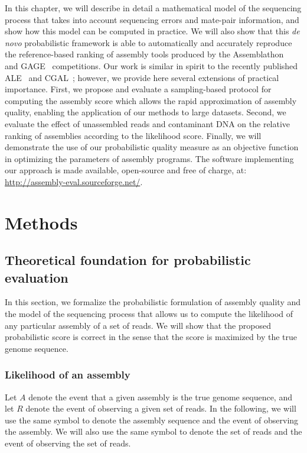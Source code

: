 \documentclass[12pt,\mydriver]{thesis}
\begin{document}
In this chapter, we will describe in detail a mathematical model of the
sequencing process that takes into account sequencing errors and
mate-pair information, and show how this model can be computed in
practice. We will also show that this \emph{de novo} probabilistic framework is able to automatically and accurately reproduce the
reference-based ranking of assembly tools produced by the
Assemblathon~\cite{earl2011assemblathon} and GAGE~\cite{salzberg2011gage}
competitions.
Our work is similar in spirit to the recently published ALE~\cite{clark2013ale} and CGAL~\cite{rahman2013cgal}; however, we provide here several extensions of practical importance.  First, we propose and evaluate a sampling-based protocol for computing the assembly score which allows the rapid approximation of assembly quality, enabling the application of our methods to large datasets.  Second, we evaluate the effect of unassembled reads and contaminant DNA on the relative ranking of assemblies according to the likelihood score.
Finally, we will
demonstrate the use of our probabilistic quality measure as an
objective function in optimizing the parameters of assembly programs.
The software implementing our approach is made available, open-source
and free of charge, at: \url{http://assembly-eval.sourceforge.net/}.


\section{Methods}
\label{theory}

\subsection{Theoretical foundation for probabilistic evaluation}
In this section, we formalize the probabilistic formulation of
assembly quality and the model of the sequencing process that
allows us to compute the likelihood of any particular assembly of a
set of reads.  We will show that the proposed probabilistic score is
correct in the sense that the score is maximized by the true genome
sequence.

\subsubsection{Likelihood of an assembly}
Let $A$ denote the event that a given assembly is the true genome
sequence, and let $R$ denote the event of observing a given set of
reads.  In the following, we will use the same symbol to denote the
assembly sequence and the event of observing the assembly.  We will
also use the same symbol to denote the set of reads and the event of
observing the set of reads.
\end{document}
